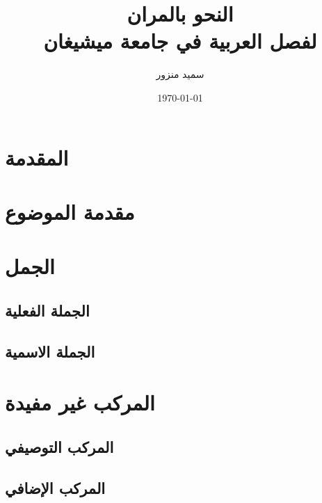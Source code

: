 \documentclass[12pt,twoside]{report}
\title{النحو بالمران\\لفصل العربية في جامعة ميشيغان}
\author{\textarabic{سميد منزور}}
\date{\today} %
\begin{document}
\maketitle
\thispagestyle{empty} %
\tableofcontents

\pagebreak

\chapter{المقدمة}


\chapter{مقدمة الموضوع}


\chapter{الجمل}



\section{الجملة الفعلية}



\section{الجملة الاسمية}



\chapter{المركب غير مفيدة}



\section{المركب التوصيفي}



\section{المركب الإضافي}


\end{document}

